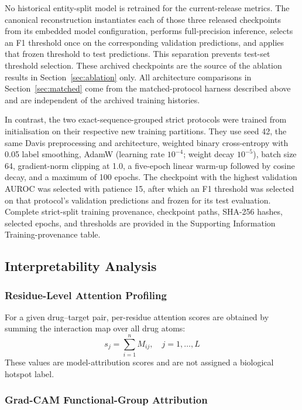 \documentclass[fleqn,10pt]{wlscirep}
\begin{document}
No historical entity-split model is retrained for the current-release metrics.
The canonical reconstruction instantiates each of those three released
checkpoints from its embedded model configuration, performs full-precision
inference, selects an F1 threshold once on the corresponding validation
predictions, and applies that frozen threshold to test predictions. This
separation prevents test-set threshold selection.
\begingroup\color{red}
These archived checkpoints are the source of the ablation results in
Section~\ref{sec:ablation} only.  All architecture comparisons in
Section~\ref{sec:matched} come from the matched-protocol harness described
above and are independent of the archived training histories.
\endgroup

In contrast, the two exact-sequence-grouped strict protocols were trained from
initialisation on their respective new training partitions. They use seed 42,
the same Davis preprocessing and architecture, weighted binary cross-entropy
with 0.05 label smoothing, AdamW (learning rate $10^{-4}$; weight decay
$10^{-5}$), batch size 64, gradient-norm clipping at 1.0, a five-epoch linear
warm-up followed by cosine decay, and a maximum of 100 epochs. The checkpoint
with the highest validation AUROC was selected with patience 15, after which an
F1 threshold was selected on that protocol's validation predictions and frozen
for its test evaluation. Complete strict-split training provenance, checkpoint
paths, SHA-256 hashes, selected epochs, and thresholds are provided in the
Supporting Information Training-provenance table.

\subsection{Interpretability Analysis}

\subsubsection{Residue-Level Attention Profiling}

For a given drug--target pair, per-residue attention scores are obtained by
summing the interaction map over all drug atoms:
\begin{equation}
s_j = \sum_{i=1}^{n} M_{ij},\quad j=1,\ldots,L
\end{equation}
These values are model-attribution scores and are not assigned a biological
hotspot label.

\subsubsection{Grad-CAM Functional-Group Attribution}
\end{document}
